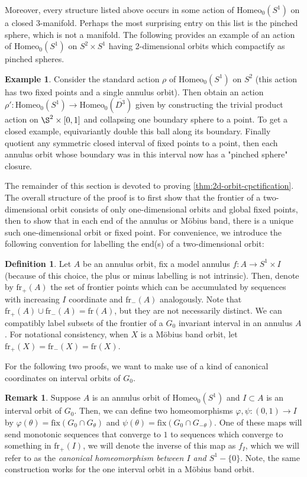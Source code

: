 \documentclass[10pt, oneside]{article}
\newcommand{\homeo}[1][S^1]{\text{Homeo}_0(#1)}
\newcommand{\cl}[1]{\overline{#1}}
\theoremstyle{definition}
\newtheorem{defn}{Definition}[section]
\newtheorem{eg}{Example}[section]
\newtheorem{rem}{Remark}[section]
\theoremstyle{definition}
\begin{document}
Moreover, every structure listed above occurs in some action of $\homeo$ on a closed 3-manifold. Perhaps the most surprising entry on this list is the pinched sphere, which is not a manifold. The following provides an example of an action of $\homeo$ on $S^2 \times S^1$ having 2-dimensional orbits which compactify as pinched spheres.

\begin{eg}
    Consider the standard action $\rho$ of $\homeo[S^1]$ on $S^2$ (this action has two fixed points and a single annulus orbit). Then obtain an action $\rho':\homeo[S^1]\to \homeo[\cl{D^3}]$ given by constructing the trivial product action on $\S^2\times [0,1]$ and collapsing one boundary sphere to a point. To get a closed example, equivariantly double this ball along its boundary. Finally quotient any symmetric closed interval of fixed points to a point, then each annulus orbit whose boundary was in this interval now has a "pinched sphere" closure.
\end{eg}

The remainder of this section is devoted to proving \cref{thm:2d-orbit-cpctification}. The overall structure of the proof is to first show that the frontier of a two-dimensional orbit consists of only one-dimensional orbits and global fixed points, then to show that in each end of the annulus or M\"{o}bius band, there is a unique such one-dimensional orbit or fixed point. For convenience, we introduce the following convention for labelling the end(s) of a two-dimensional orbit:

\begin{defn}
    Let $A$ be an annulus orbit, fix a model annulus $f:A\to S^1\times I$ (because of this choice, the plus or minus labelling is not intrinsic). Then, denote by $\text{fr}_+(A)$ the set of frontier points which can be accumulated by sequences with increasing $I$ coordinate and $\text{fr}_-(A)$ analogously. Note that $\text{fr}_+(A)\cup\text{fr}_-(A) = \text{fr}(A)$, but they are not necessarily distinct. We can compatibly label subsets of the frontier of a $G_0$ invariant interval in an annulus $A$. For notational consistency, when $X$ is a M\"{o}bius band orbit, let $\text{fr}_+(X) = \text{fr}_-(X) = \text{fr}(X)$.
\end{defn}

For the following two proofs, we want to make use of a kind of canonical coordinates on interval orbits of $G_0$.

\begin{rem}\cite{chen:StructureTheorems}
    Suppose $A$ is an annulus orbit of $\homeo$ and $I\subset A$ is an interval orbit of $G_0$. Then, we can define two homeomorphisms $\varphi, \psi:(0,1) \to I$ by $\varphi(\theta) = \text{fix}(G_0\cap G_\theta)$ and $\psi(\theta) = \text{fix}(G_0\cap G_{-\theta})$. One of these maps will send monotonic sequences that converge to $1$ to sequences which converge to something in $\text{fr}_+(I)$, we will denote the inverse of this map as $f_I$, which we will refer to as the {\it canonical homeomorphism between $I$ and $S^1 - \{0\}$}. Note, the same construction works for the one interval orbit in a M\"{o}bius band orbit.
\end{rem}
\end{document}
